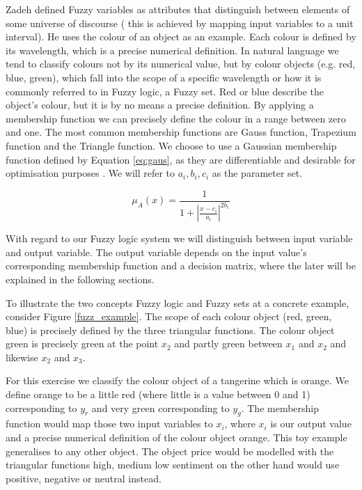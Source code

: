 Zadeh \cite{Zadeh65}  defined Fuzzy variables as attributes that distinguish between elements of some universe of discourse ( this is achieved by mapping input variables to a unit interval). He uses the colour of an object as an example. Each colour is defined by its wavelength, which is a precise numerical definition. In natural language we tend to classify colours not by its numerical value, but by colour objects (e.g. red, blue, green), which fall into the scope of a specific wavelength or how it is commonly referred to in Fuzzy logic,  a Fuzzy set. Red or blue describe the object's colour, but it is by no means a precise definition. By applying a membership function we can precisely define the colour in a range between zero and one. The most common membership functions are Gauss function, Trapezium function and the Triangle function. We choose to use a Gaussian membership function defined by Equation \ref{eq:gaus},  as they are differentiable and desirable for optimisation purposes \cite{wu12}. We will refer to $a_i, b_i, c_i$ as the parameter set.  

\begin{equation} \label{eq:gaus}
\mu_A(x) =  \frac{1}{ 1 + |\frac{x- c_i }{a_i}|^{2b_i}  }\end{equation}


With regard to our Fuzzy logic system we will distinguish between input variable and output variable. The output variable depends on the input value's corresponding membership function and a decision matrix, where the later will be explained in the following sections. 

 To illustrate the two concepts Fuzzy logic and Fuzzy sets at a concrete example, consider Figure \ref{fuzz_example}. The scope of each colour object (red, green, blue) is precisely defined by the three triangular functions. The colour object green is precisely green at the point $x_2$ and partly green between $x_1$ and $x_2$ and likewise $x_2$ and $x_3$. 
 
For this exercise we classify the colour object of a tangerine which is orange.  We define orange to be a little red (where little is a value between 0 and 1) corresponding to $y_r$ and very green corresponding to $y_g$.  The membership function would map those two input variables to $x_i$, where $x_i$ is our output value and a precise numerical definition of the colour object orange. This toy example generalises to any other object. The object price would be modelled with the triangular functions high, medium low sentiment on the other hand would use positive, negative or neutral instead. 






